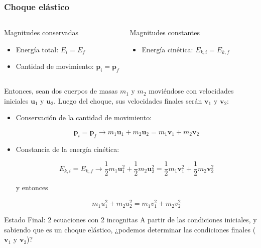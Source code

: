 \documentclass[xetex,mathserif,serif,10pt]{beamer}
\newcommand{\mb}[1]{\mathbf{#1}}
\newcommand{\be}[2]{
  \vspace{-0.5em}
  \begin{equation}\label{#2}
    #1
  \end{equation}
  \vspace{-1em}
}
\begin{document}
\begin{frame}
\frametitle{Choque elástico}
\begin{columns}
\begin{alertblock}{Magnitudes conservadas}
\begin{itemize}
\item Energía total: $E_i=E_f$
\item Cantidad de movimiento: $\mathbf{p}_i = \mathbf{p}_f$
\end{itemize}
\end{alertblock}
\begin{exampleblock}{Magnitudes constantes}
\begin{itemize}
\item Energía cinética: $E_{k,i}=E_{k,f}$
\end{itemize}
\end{exampleblock}
\end{columns}
Entonces, sean dos cuerpos de masas $m_1$ y $m_2$ moviéndose con velocidades iniciales $\mathbf{u}_1$ y $\mathbf{u}_2$. Luego del choque, sus velocidades finales serán $\mb{v}_1$ y $\mb{v}_2$:
\begin{itemize}
\item Conservación de la cantidad de movimiento: 
\be{
\mathbf{p}_i = \mathbf{p}_f \to m_1 \mb{u}_1 + m_2 \mb{u}_2 =  m_1 \mb{v}_1 + m_2 \mb{v}_2
}{EQImpulso}
\item Constancia de la energía cinética:
\be{
E_{k,i}=E_{k,f} \to \frac12 m_1 \mb{u}_1^2 + \frac12 m_2 \mb{u}_2^2 =  \frac12 m_1 \mb{v}_1^2 + \frac12 m_2 \mb{v}_2^2
}{EQCinetica}
y entonces
\be{
m_1 u_1^2 + m_2 u_2^2 =  m_1 v_1^2 + m_2 v_2^2
}{EQCin}
\end{itemize}
\begin{block}{Estado Final: 2 ecuaciones con 2 incognitas}
A partir de las condiciones iniciales, y sabiendo que es un choque elástico, ¿podemos determinar las condiciones finales ($\mb{v}_1$ y $\mb{v}_2$)?
\end{block}
\end{frame}
\end{document}
